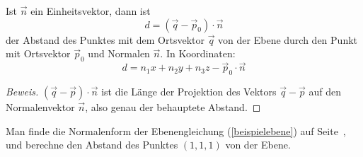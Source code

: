 \begin{satz}
Ist $\vec n$ ein Einheitsvektor, dann ist
\[
d=(\vec q-\vec p_0)\cdot \vec n
\]
der Abstand des Punktes mit dem Ortsvektor $\vec q$ von der Ebene durch
den Punkt mit Ortsvektor $\vec p_0$ und Normalen $\vec n$.
In Koordinaten:
\[
d=n_1x+n_2y+n_3z-\vec p_0\cdot\vec n
\]
\end{satz}
\begin{proof}[Beweis]
$(\vec q-\vec p)\cdot \vec n$ ist die Länge der Projektion des Vektors
$\vec q -\vec p$ auf den Normalenvektor $\vec n$, also genau der behauptete
Abstand.
\end{proof}

\begin{beispiel}
Man finde die Normalenform der Ebenengleichung (\ref{beispielebene}) auf
Seite~\pageref{beispielebene},
und berechne den Abstand des Punktes $(1,1,1)$ von der Ebene.

\medskip


\end{beispiel}
